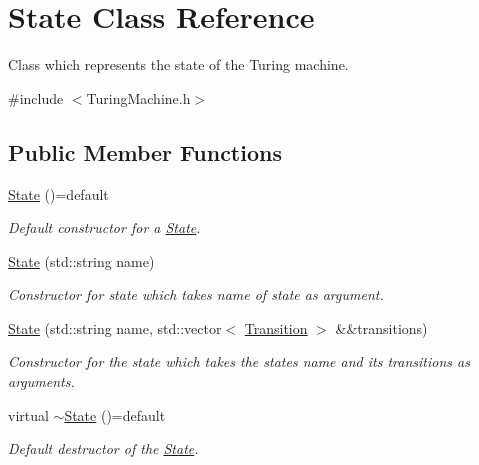 \hypertarget{classState}{}\section{State Class Reference}
\label{classState}


Class which represents the state of the Turing machine.  




{\ttfamily \#include $<$Turing\+Machine.\+h$>$}

\subsection*{Public Member Functions}
\begin{DoxyCompactItemize}
\item 
\mbox{\label{classState_a95aa2ca390f05627acf00149efd568c7}} 
\hyperlink{classState_a95aa2ca390f05627acf00149efd568c7}{State} ()=default
\begin{DoxyCompactList}\small\item\em Default constructor for a \hyperlink{classState}{State}. \end{DoxyCompactList}\item 
\hyperlink{classState_acec8f151d743a370200a6468cdb6ed5e}{State} (std\+::string name)
\begin{DoxyCompactList}\small\item\em Constructor for state which takes name of state as argument. \end{DoxyCompactList}\item 
\hyperlink{classState_afc0a48251083c35bb1acb67f1fb89f0e}{State} (std\+::string name, std\+::vector$<$ \hyperlink{classTransition}{Transition} $>$ \&\&transitions)
\begin{DoxyCompactList}\small\item\em Constructor for the state which takes the states name and its transitions as arguments. \end{DoxyCompactList}\item 
\mbox{\label{classState_a783d52422b544bb226e13de8ecfd6ad6}} 
virtual \hyperlink{classState_a783d52422b544bb226e13de8ecfd6ad6}{$\sim$\+State} ()=default
\begin{DoxyCompactList}\small\item\em Default destructor of the \hyperlink{classState}{State}. \end{DoxyCompactList}\item 

\end{DoxyCompactItemize}
